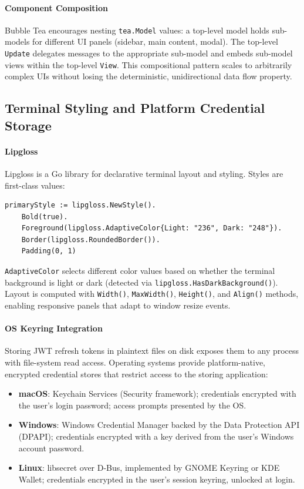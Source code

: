 \paragraph{Component Composition}

Bubble Tea encourages nesting \texttt{tea.Model} values: a top-level model holds sub-models for different UI panels (sidebar, main content, modal). The top-level \texttt{Update} delegates messages to the appropriate sub-model and embeds sub-model views within the top-level \texttt{View}. This compositional pattern scales to arbitrarily complex UIs without losing the deterministic, unidirectional data flow property.

\subsection{Terminal Styling and Platform Credential Storage}

\paragraph{Lipgloss}

Lipgloss is a Go library for declarative terminal layout and styling. Styles are first-class values:

\begin{verbatim}
primaryStyle := lipgloss.NewStyle().
    Bold(true).
    Foreground(lipgloss.AdaptiveColor{Light: "236", Dark: "248"}).
    Border(lipgloss.RoundedBorder()).
    Padding(0, 1)
\end{verbatim}

\texttt{AdaptiveColor} selects different color values based on whether the terminal background is light or dark (detected via \texttt{lipgloss.HasDarkBackground()}). Layout is computed with \texttt{Width()}, \texttt{MaxWidth()}, \texttt{Height()}, and \texttt{Align()} methods, enabling responsive panels that adapt to window resize events.

\paragraph{OS Keyring Integration}

Storing JWT refresh tokens in plaintext files on disk exposes them to any process with file-system read access. Operating systems provide platform-native, encrypted credential stores that restrict access to the storing application:

\begin{itemize}
    \item \textbf{macOS}: Keychain Services (Security framework); credentials encrypted with the user's login password; access prompts presented by the OS.
    \item \textbf{Windows}: Windows Credential Manager backed by the Data Protection API (DPAPI); credentials encrypted with a key derived from the user's Windows account password.
    \item \textbf{Linux}: libsecret over D-Bus, implemented by GNOME Keyring or KDE Wallet; credentials encrypted in the user's session keyring, unlocked at login.
\end{itemize}

